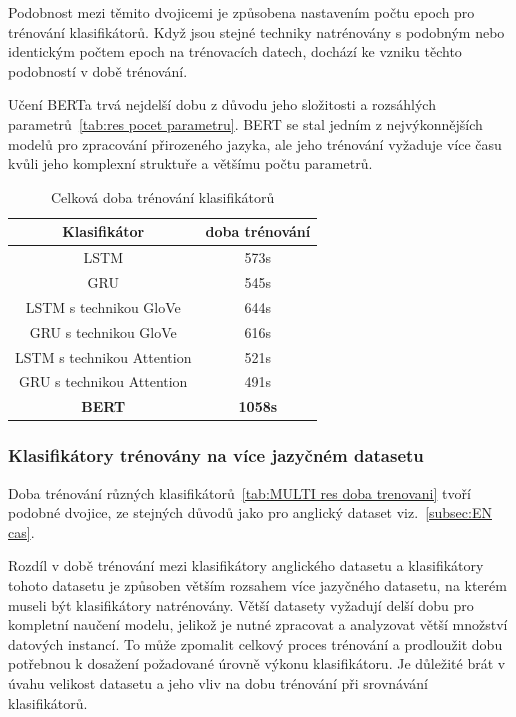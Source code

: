 Podobnost mezi těmito dvojicemi je způsobena nastavením počtu epoch pro trénování klasifikátorů.
Když jsou stejné techniky natrénovány s podobným nebo identickým počtem epoch na trénovacích datech, dochází ke vzniku těchto podobností v době trénování.

Učení BERTa trvá nejdelší dobu z důvodu jeho složitosti a rozsáhlých parametrů~\ref{tab:res pocet parametru}.
BERT se stal jedním z nejvýkonnějších modelů pro zpracování přirozeného jazyka, ale jeho trénování vyžaduje více času kvůli jeho komplexní struktuře a většímu počtu parametrů.

\begin{table}[H]
	\centering
	\caption{Celková doba trénování klasifikátorů}\label{tab:res doba trenovani}
	\begin{tabular}{ c c }
			\toprule
			Klasifikátor & doba trénování\\
			\midrule
			LSTM & 573s\\
			GRU & 545s\\         
			LSTM s technikou GloVe & 644s\\         
			GRU s technikou GloVe & 616s\\         
			LSTM s technikou Attention & 521s\\         
			GRU s technikou Attention & 491s\\         
			\textbf{BERT} & \textbf{1058s}\\         
			\midrule
		\end{tabular}
\end{table}

\subsubsection{Klasifikátory trénovány na více jazyčném datasetu}
Doba trénování různých klasifikátorů~\ref{tab:MULTI res doba trenovani} tvoří podobné dvojice, ze stejných důvodů jako pro anglický dataset viz.~\ref{subsec:EN cas}.

Rozdíl v době trénování mezi klasifikátory anglického datasetu a klasifikátory tohoto datasetu je způsoben větším rozsahem více jazyčného datasetu, na kterém museli být klasifikátory natrénovány.
Větší datasety vyžadují delší dobu pro kompletní naučení modelu, jelikož je nutné zpracovat a analyzovat větší množství datových instancí.
To může zpomalit celkový proces trénování a prodloužit dobu potřebnou k dosažení požadované úrovně výkonu klasifikátoru.
Je důležité brát v úvahu velikost datasetu a jeho vliv na dobu trénování při srovnávání klasifikátorů.

